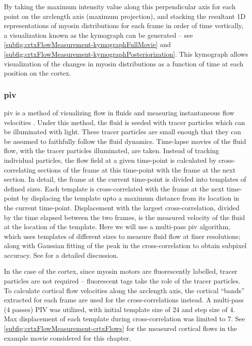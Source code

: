 By taking the maximum intensity value along this perpendicular axis for each point on the arclength axis (maximum projection), and stacking the resultant 1D representations of myosin distributions for each frame in order of time vertically, a visualization known as the kymograph can be generated -- see \autoref{subfig:crtxFlowMeasurement-kymographFullMovie} and \autoref{subfig:crtxFlowMeasurement-kymographPosteriorization}. This kymograph allows visualization of the changes in myosin distributions as a function of time at each position on the cortex.

\subsubsection{\acf{piv}}\label{subsubsec:pivCortex}
\ac{piv} is a method of visualizing flow in fluids and measuring instantaneous flow velocities \citep{raffel1998particle,thielicke2014pivlab}. Under this method, the fluid is seeded with tracer particles which can be illuminated with light. These tracer particles are small enough that they can be assumed to faithfully follow the fluid dynamics. Time-lapse movies of the fluid flow, with the tracer particles illuminated, are taken. Instead of tracking individual particles, the flow field at a given time-point is calculated by cross-correlating sections of the frame at this time-point with the frame at the next section. In detail, the frame at the current time-point is divided into templates of defined sizes. Each template is cross-correlated with the frame at the next time-point by displacing the template upto a maximum distance from its location in the current time-point. Displacement with the largest cross-correlation, divided by the time elapsed between the two frames, is the measured velocity of the fluid at the location of the template. Here we will use a multi-pass \ac{piv} algorithm, which uses templates of different sizes to measure fluid flow at finer resolutions; along with Gaussian fitting of the peak in the cross-correlation to obtain subpixel accuracy. See \cite{raffel1998particle} for a detailed discussion. 

In the case of the cortex, since myosin motors are fluorescently labelled, tracer particles are not required -- fluorescent tags take the role of the tracer particles. To calculate cortical flow velocities along the arclength axis, the cortical \enquote{bands} extracted for each frame are used for the cross-correlations instead. A multi-pass (4 passes) PIV was utilized, with initial template size of \SI{24}{\pixels} and step size of \SI{4}{\pixels}. Max displacement of each template during cross-correlation was limited to \SI{7}{\pixels}. See \autoref{subfig:crtxFlowMeasurement-crtxFlows} for the measured cortical flows in the example movie considered for this chapter.

